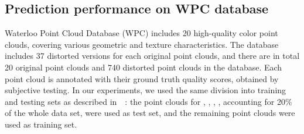 \documentclass[conference]{IEEEtran}
\begin{document}
\begin{table}[t]
\begin{center}
\caption{Ablation study of the COPP-Net model on the WPC database. AVE stands for average pooling, and CORA stands for correlation weight pooling strategy.}
\label{tab:ablation}
\end{center}
\end{table}











\subsection{Prediction performance on WPC database}
Waterloo Point Cloud Database (WPC) includes 20 high-quality color point clouds, covering various geometric and texture characteristics. The database includes 37 distorted versions for each original point clouds, and there are in total 20 original point clouds and 740 distorted point clouds in the database. Each point cloud is annotated with their ground truth quality scores, obtained by subjective testing. In our experiments, we used the same division into training and testing sets as described in~\cite{liu2021pqa}~\cite{zhang2022no}: the point clouds for , , , , accounting for 20\% of the whole data set, were used as test set, and the remaining point clouds were used as training set.
\end{document}

